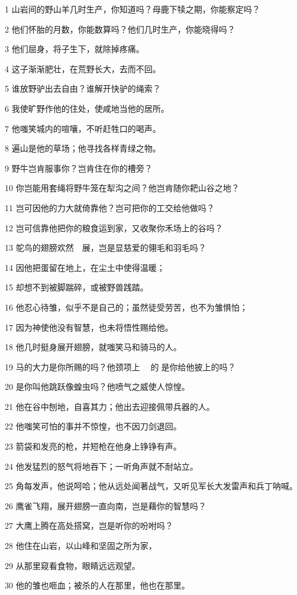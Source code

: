 \par 1 山岩间的野山羊几时生产，你知道吗？母鹿下犊之期，你能察定吗？
\par 2 他们怀胎的月数，你能数算吗？他们几时生产，你能晓得吗？
\par 3 他们屈身，将子生下，就除掉疼痛。
\par 4 这子渐渐肥壮，在荒野长大，去而不回。
\par 5 谁放野驴出去自由？谁解开快驴的绳索？
\par 6 我使旷野作他的住处，使咸地当他的居所。
\par 7 他嗤笑城内的喧嚷，不听赶牲口的喝声。
\par 8 遍山是他的草场；他寻找各样青绿之物。
\par 9 野牛岂肯服事你？岂肯住在你的槽旁？
\par 10 你岂能用套绳将野牛笼在犁沟之间？他岂肯随你耙山谷之地？
\par 11 岂可因他的力大就倚靠他？岂可把你的工交给他做吗？
\par 12 岂可信靠他把你的粮食运到家，又收聚你禾场上的谷吗？
\par 13 鸵鸟的翅膀欢然　展，岂是显慈爱的翎毛和羽毛吗？
\par 14 因他把蛋留在地上，在尘土中使得温暖；
\par 15 却想不到被脚踹碎，或被野兽践踏。
\par 16 他忍心待雏，似乎不是自己的；虽然徒受劳苦，也不为雏惧怕；
\par 17 因为神使他没有智慧，也未将悟性赐给他。
\par 18 他几时挺身展开翅膀，就嗤笑马和骑马的人。
\par 19 马的大力是你所赐的吗？他颈项上　的是你给他披上的吗？
\par 20 是你叫他跳跃像蝗虫吗？他喷气之威使人惊惶。
\par 21 他在谷中刨地，自喜其力；他出去迎接佩带兵器的人。
\par 22 他嗤笑可怕的事并不惊惶，也不因刀剑退回。
\par 23 箭袋和发亮的枪，并短枪在他身上铮铮有声。
\par 24 他发猛烈的怒气将地吞下；一听角声就不耐站立。
\par 25 角每发声，他说呵哈；他从远处闻著战气，又听见军长大发雷声和兵丁呐喊。
\par 26 鹰雀飞翔，展开翅膀一直向南，岂是藉你的智慧吗？
\par 27 大鹰上腾在高处搭窝，岂是听你的吩咐吗？
\par 28 他住在山岩，以山峰和坚固之所为家，
\par 29 从那里窥看食物，眼睛远远观望。
\par 30 他的雏也咂血；被杀的人在那里，他也在那里。

